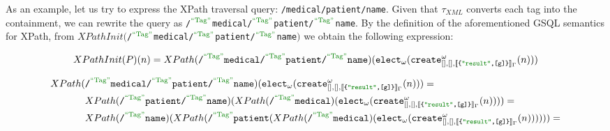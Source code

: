 %

\begin{example}
As an example, let us try to express the XPath traversal query: \texttt{/medical/patient/name}. Given that $\tau_{XML}$ converts each tag into the  containment, we can rewrite the query as \texttt{/}$^{\mstr{Tag}}$\texttt{medical/}$^{\mstr{Tag}}$\texttt{patient/}$^{\mstr{Tag}}$\texttt{name}. By the definition of the aforementioned GSQL semantics for XPath, from $XPathInit($\texttt{/}$^{\mstr{Tag}}$\texttt{medical/}$^{\mstr{Tag}}$\texttt{patient/}$^{\mstr{Tag}}$\texttt{name}$)$ we obtain the following expression:
\medskip

\hspace*{-1.5cm}\vbox{\[XPathInit(P)(n) = XPath(\texttt{/}^{\mstr{Tag}}\texttt{medical/}^{\mstr{Tag}}\texttt{patient/}^{\mstr{Tag}}\texttt{name}) (\texttt{elect}_\omega(\texttt{create}^\omega_{[],[],\jsem{\texttt{\{\mstr{result},[g]\}}}_\Gamma}(n)))\]}
\medskip

\hspace*{-2cm}\vbox{\[\begin{split}
XPath(&\texttt{/}^{\mstr{Tag}}\texttt{medical/}^{\mstr{Tag}}\texttt{patient/}^{\mstr{Tag}}\texttt{name})(\texttt{elect}_\omega(\texttt{create}^\omega_{[],[],\jsem{\texttt{\{\mstr{result},[g]\}}}_\Gamma}(n)))=\\
	&XPath(\texttt{/}^{\mstr{Tag}}\texttt{patient/}^{\mstr{Tag}}\texttt{name})(XPath(\texttt{/}^{\mstr{Tag}}\texttt{medical})(\texttt{elect}_\omega(\texttt{create}^\omega_{[],[],\jsem{\texttt{\{\mstr{result},[g]\}}}_\Gamma}(n))))=\\
	&XPath(\texttt{/}^{\mstr{Tag}}\texttt{name})(XPath(\texttt{/}^{\mstr{Tag}}\texttt{patient}(XPath(\texttt{/}^{\mstr{Tag}}\texttt{medical})(\texttt{elect}_\omega(\texttt{create}^\omega_{[],[],\jsem{\texttt{\{\mstr{result},[g]\}}}_\Gamma}(n))))))=\\
\end{split}\]}
\medskip


\end{example}
